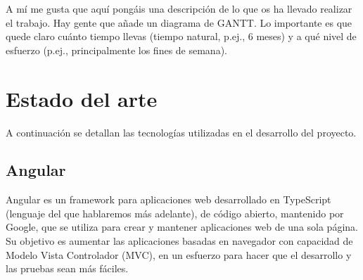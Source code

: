 \documentclass[a4paper, 12pt]{book}
\begin{document}
A mí me gusta que aquí pongáis una descripción de lo que os ha llevado realizar el trabajo.
Hay gente que añade un diagrama de GANTT.
Lo importante es que quede claro cuánto tiempo llevas (tiempo natural, p.ej., 6 meses) y a qué nivel de esfuerzo (p.ej., principalmente los fines de semana).



\cleardoublepage
\chapter{Estado del arte}
\label{chap:estado}

A continuación se detallan las tecnologías utilizadas en el desarrollo del proyecto.



\section{Angular} 
\label{sec:Angular}
Angular es un framework para aplicaciones web desarrollado en TypeScript (lenguaje del que hablaremos más adelante), de código abierto, mantenido por Google, que se utiliza para crear y mantener aplicaciones web de una sola página. Su objetivo es aumentar las aplicaciones basadas en navegador con capacidad de Modelo Vista Controlador (MVC), en un esfuerzo para hacer que el desarrollo y las pruebas sean más fáciles.
\end{document}
